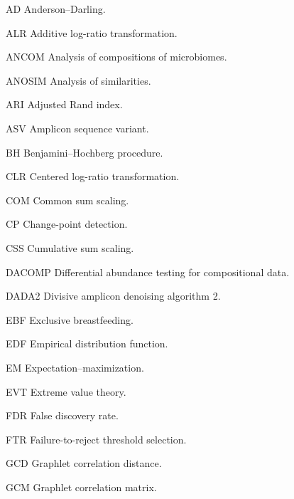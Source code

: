 \begin{notationlist}
	
	\item[AD] Anderson--Darling.
	
	\item[ALR] Additive log-ratio transformation.
	
	\item[ANCOM] Analysis of compositions of microbiomes.
	
	\item[ANOSIM] Analysis of similarities.
	
	\item[ARI] Adjusted Rand index.
	
	\item[ASV] Amplicon sequence variant.
	
	\item[BH] Benjamini--Hochberg procedure.
	
	\item[CLR] Centered log-ratio transformation.
	
	\item[COM] Common sum scaling.
	
	\item[CP] Change-point detection.
	
	\item[CSS] Cumulative sum scaling.
	
	\item[DACOMP] Differential abundance testing for compositional data.
	
	\item[DADA2] Divisive amplicon denoising algorithm 2.
	
	\item[EBF] Exclusive breastfeeding.
	
	\item[EDF] Empirical distribution function.
	
	\item[EM] Expectation--maximization.
	
	\item[EVT] Extreme value theory.
	
	\item[FDR] False discovery rate.
	
	\item[FTR] Failure-to-reject threshold selection.
	
	\item[GCD] Graphlet correlation distance.
	
	\item[GCM] Graphlet correlation matrix.
	

\end{notationlist}
